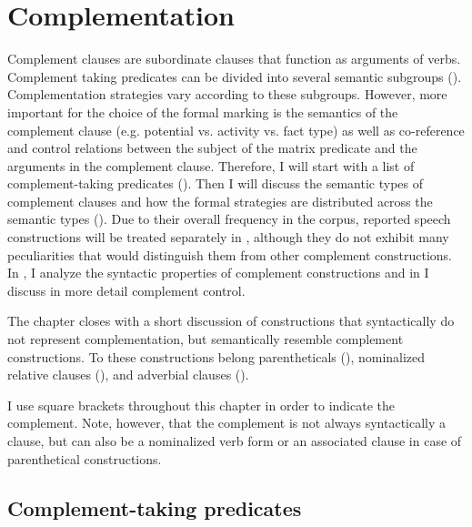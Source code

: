 \chapter{Complementation}
\label{cpt:Complementation}

Complement clauses are subordinate clauses that function as arguments of verbs. Complement taking predicates can be divided into several semantic subgroups (). Complementation strategies vary according to these subgroups. However, more important for the choice of the formal marking is the semantics of the complement clause (e.g. potential vs. activity vs. fact type) as well as co-reference and control relations between the subject of the matrix predicate and the arguments in the complement clause. Therefore, I will start with a list of complement-taking predicates (). Then I will discuss the semantic types of complement clauses and how the formal strategies are distributed across the semantic types (). Due to their overall frequency in the corpus, reported speech constructions will be treated separately in , although they do not exhibit many peculiarities that would distinguish them from other complement constructions. In , I analyze the syntactic properties of complement constructions and in  I discuss in more detail complement control. 

The chapter closes with a short discussion of constructions that syntactically do not represent complementation, but semantically resemble complement constructions. To these constructions belong parentheticals (), nominalized relative clauses (), and adverbial clauses ().

I use square brackets throughout this chapter in order to indicate the complement. Note, however, that the complement is not always syntactically a clause, but can also be a nominalized verb form or an associated clause in case of parenthetical constructions.



\section{Complement-taking predicates}
\label{sec:Complement-taking predicates}

